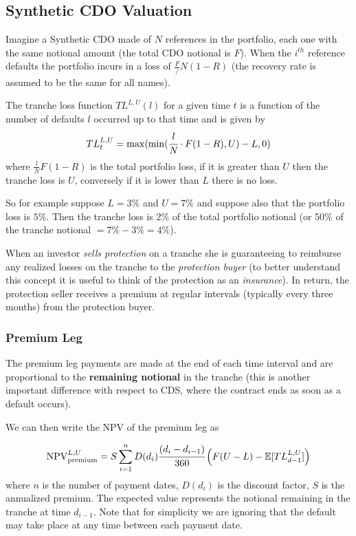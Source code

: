 \subsection{Synthetic CDO Valuation}
Imagine a Synthetic CDO made of $N$ references in the portfolio, each one with the same notional amount (the total CDO notional is $F$).
When the $i^{th}$ reference defaults the portfolio incurs in a loss of $\frac{F}/{N}(1-R)$ (the recovery rate is assumed to be the same for all names).

The tranche loss function $TL^{L,U}(l)$ for a given time $t$ is a function of the number of defaults $l$ occurred up to that time and is given by
\begin{equation}
TL_{t}^{L,U}=\mathrm{max}(\mathrm{min}(\cfrac{l}{N}\cdot F(1-R), U)-L, 0)
\end{equation}
where $\frac{l}{N}F(1-R)$ is the total portfolio loss, if it is greater than $U$ then the tranche loss is $U$, conversely if it is lower than $L$ there is no loss.

So for example suppose $L=3\%$ and $U=7\%$ and suppose also that the portfolio loss is $5\%$. Then the tranche loss is 2\% of the total portfolio notional (or 50\% of the tranche notional $=7\%-3\%=4\%$).

When an investor \emph{sells protection} on a tranche she is guaranteeing to reimburse any realized losses on the tranche to the \emph{protection buyer} (to better understand this concept it is useful to think of the protection as an \emph{insurance}). 
In return, the protection seller receives a premium at regular intervals (typically every three months) from the protection buyer.

\subsubsection{Premium Leg}
The premium leg payments are made at the end of each time interval and are proportional to the \textbf{remaining notional} in the tranche (this is another important difference with respect to CDS, where the contract ends as soon as a default occurs).

We can then write the NPV of the premium leg as

\begin{equation}
\mathrm{NPV}_{\mathrm{premium}}^{L,U}=S\sum^{n}_{i=1}D(d_i)\cfrac{(d_i - d_{i-1})}{360}\left(F(U-L)-\mathbb{E}[TL_{d-1}^{L,U}]\right)
\label{eq:cdo_npv_premium}
\end{equation}
where $n$ is the number of payment dates, $D(d_i)$ is the discount factor, $S$ is the annualized premium. The expected value represents the notional remaining in the tranche at time $d_{i-1}$.
Note that for simplicity we are ignoring that the default may take place at any time between each payment date.

